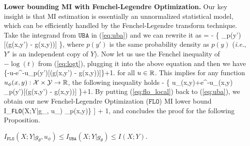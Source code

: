 \documentclass{article}
\theoremstyle{plain}
\theoremstyle{definition}
\theoremstyle{remark}
\newcommand{\UBA}{\texttt{UBA}}
\newcommand{\FLO}{\texttt{FLO}}
\begin{document}
		{\bf Lower bounding MI with Fenchel-Legendre Optimization.} Our key insight is that MI estimation is essentially an unnormalized statistical model, which can be efficiently handled by the Fenchel-Legendre transform technique. Take the integrand from $\UBA$ in (\ref{eq:uba}) and we can rewrite it as
		\beq
		\log {} = - \log \left\{ \EE_{p(y')}[\exp(g(x,y') - g(x,y))] \right\}, 
			\label{eq:log_integrand}
			\eeq
			where $p(y')$ is the same probability density as $p(y)$ ({\it i.e.}, $Y'$ is an independent copy of $Y$). Now let us use the Fenchel inequality of $-\log(t)$ from (\ref{eq:logt}), plugging it into the above equation and then we have
			\beq
			\log {} \geq \left\{-u-e^{-u}\EE_{p(y')}[\exp(g(x,y') - g(x,y))]\right\}+1.
			\eeq
			for all $u \in \mathbb{R}$. This implies for any function $u_{\phi}(x,y): \mathcal{X} \times \mathcal{Y} \rightarrow \mathbb{R}$, the following inequality holds 
			\beq
			\log {} \geq - \{ u_{\phi}(x,y)+e^{-u_{\phi}(x,y)} \EE_{p(y')}[\exp(g(x,y') - g(x,y))] \}+1.
			\label{eq:flo_local}
			\eeq
			By putting (\ref{eq:flo_local}) back to (\ref{eq:uba}), we obtain our new Fenchel-Legendre Optimization ($\FLO$) MI lower bound
			\beq
			I_{\FLO}(X;Y|g_{\theta}, u_{\phi}) \triangleq \EE_{p(x,y)}\left[ - \{ u_{\phi}(x,y)+e^{-u_{\phi}(x,y)} \EE_{p(y')}[e^{g_{\theta}(x,y') - g_{\theta}(x,y)}] \} \right] + 1,
			\label{eq:flo_defn}
			\eeq
			and concludes the proof for the following Proposition. 
			\begin{prop}
				\label{thm:flo}
				$I_{\FLO}(X;Y|g_{\theta}, u_{\phi}) \leq I_{\UBA}(X;Y|g_{\theta}) \leq I(X;Y)$.
			\end{prop}
			
\end{document}
